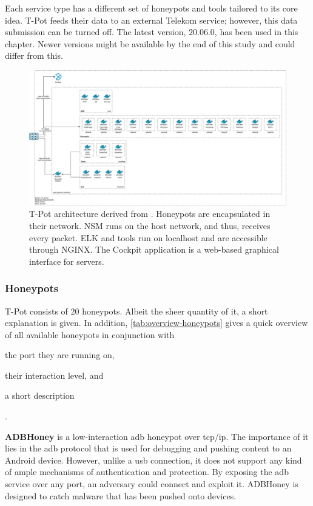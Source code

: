 Each service type has a different set of honeypots and tools tailored to its core idea.
T-Pot feeds their data to an external Telekom service; however, this data submission can be turned off.
The latest version, $20.06.0$, has been used in this chapter.
Newer versions might be available by the end of this study and could differ from this.

\begin{figure}
    \centering
    \includegraphics[width=\textwidth]{figures/tpot-architecture.pdf}
    \caption[T-Pot architecture]{
        T-Pot architecture derived from \cite{tpot2021}.
        Honeypots are encapsulated in their network.
        NSM runs on the host network, and thus, receives every packet.
        ELK and tools run on localhost and are accessible through NGINX.
        The Cockpit application is a web-based graphical interface for servers.
    }
    \label{fig:overview-tpot}
\end{figure}

\subsubsection{Honeypots}
\label{subsubsec:honeypots}

T-Pot consists of 20 honeypots.
Albeit the sheer quantity of it, a short explanation is given.
In addition, \autoref{tab:overview-honeypots} gives a quick overview of all available honeypots in conjunction with
\begin{enumerate*}[label=(\roman*)]
    \item the port they are running on,
    \item their interaction level, and
    \item a short description
\end{enumerate*}.

\textbf{ADBHoney} \cite{adbhoney2021} is a low-interaction \ac{adb} honeypot over \ac{tcp}/\ac{ip}.
The importance of it lies in the \ac{adb} protocol that is used for debugging and pushing content to an Android device.
However, unlike a \ac{usb} connection, it does not support any kind of ample mechanisms of authentication and protection.
By exposing the \ac{adb} service over any port, an adversary could connect and exploit it.
ADBHoney is designed to catch malware that has been pushed onto devices.

